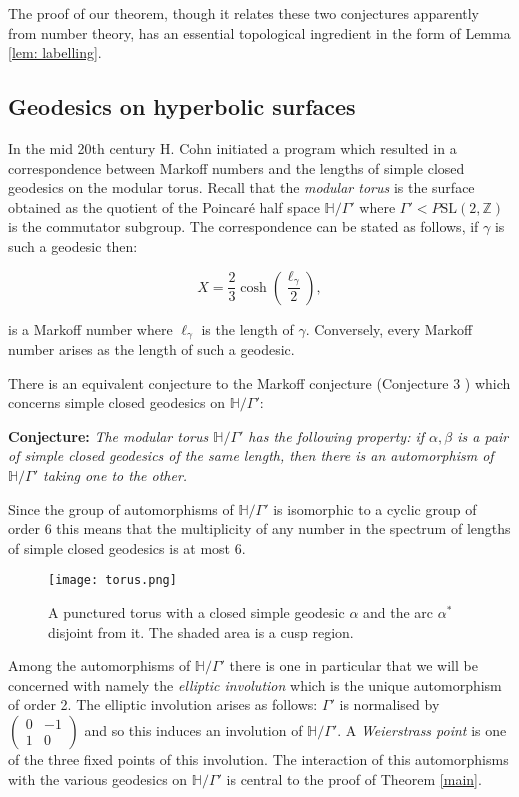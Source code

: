 \documentclass[12pt,a4paper]{amsart}
\def\HH{\mathbb{H}}
\def\xx{\HH/\Gamma'}
\def\ZZ{\mathbb{Z}}
\def\sl2{\mathrm{SL}(2, \ZZ)}
\begin{document}
The proof of our theorem, though it relates these two conjectures apparently from
number theory, has an essential topological ingredient in the form of Lemma
\ref{lem: labelling}.

\subsection{Geodesics on hyperbolic surfaces} In the mid 20th century H. Cohn
initiated a program which resulted in a correspondence between Markoff numbers
and the lengths of simple closed geodesics on the modular torus. Recall that
the \textit{modular torus} is the surface obtained as the quotient of the
Poincar\'e half space $\HH/\Gamma'$ where $\Gamma' < P\sl2$ is the commutator
subgroup. The correspondence can be stated as follows, if $\gamma$ is such a
geodesic then: 

\begin{equation} X  = \frac{2}{3} \cosh \left(
\frac{\ell_\gamma}{2}\right),
\end{equation} 

is a Markoff number where
$\ell_\gamma$ is the length of $\gamma$. Conversely, every Markoff number
arises as the length of such a geodesic.

There is an equivalent conjecture to the Markoff conjecture (Conjecture 3
\cite{mcp}) which concerns simple closed geodesics on $\xx$:

\noindent
\textbf{Conjecture:} \textit{The modular torus $\xx$ has the following property: if $\alpha, \beta$
is a pair of simple closed geodesics of the same length, then there is an
automorphism  of $\xx$ taking one to the other.}

Since the group of automorphisms of $\xx$ is isomorphic to a cyclic group of
order 6 this means that the multiplicity of any number in the spectrum of
lengths of simple closed geodesics is at most 6.

\begin{figure}[ht]
\begin{center}
\texttt{[image: torus.png]} 
\end{center}
\caption{A punctured torus with a closed simple geodesic $\alpha$ and the arc $\alpha^*$ disjoint from it. The shaded area is a cusp region.}
	\label{fig:torus}
\end{figure}

Among the automorphisms of $\xx$ there is one in particular that we will be
concerned with namely the \textit{elliptic involution} which is the unique
automorphism of order 2. The elliptic involution arises as follows: $\Gamma'$
is normalised by $\begin{pmatrix} 0 & -1 \\ 1 & 0 \end{pmatrix}$ and so this
induces an involution of $\xx$. A \textit{Weierstrass point} is one of the
three fixed points of this involution. The interaction of this automorphisms
with the various geodesics on $\xx$ is central to the proof of Theorem
\ref{main}.
\end{document}

